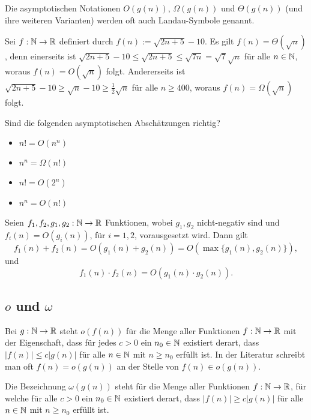 \begin{bem}
Die asymptotischen Notationen $O(g(n))$, $\Omega(g(n))$ und $\Theta(g(n))$ (und ihre weiteren Varianten) werden oft auch Landau-Symbole genannt.
\end{bem} 

\begin{bsp}
	Sei $f : \mathbb{N} \to \mathbb{R}$ definiert durch $f(n):=\sqrt{2 n + 5 } - 10$. Es gilt $f(n) = \Theta(\sqrt{n})$, denn einerseits ist $\sqrt{2n + 5} - 10 \le \sqrt{2n + 5} \le \sqrt{ 7n} = \sqrt{7} \sqrt{n}$ für alle $n \in \mathbb{N}$, woraus $f(n) = O(\sqrt{n})$ folgt. Andererseits ist $\sqrt{2n + 5} - 10 \ge \sqrt{n} - 10 \ge \frac{1}{2} \sqrt{n}$ für alle $n \ge 400$, woraus $f(n) = \Omega(\sqrt{n})$ folgt.  
\end{bsp}

\begin{aufg}
	Sind die folgenden asymptotischen Abschätzungen richtig?
	\begin{itemize}
		\item $n! = O(n^n)$
		\item $n^n = \Omega(n!)$
		\item $n! = O(2^n)$
		\item $n^n = O(n!)$
	\end{itemize}
\end{aufg}


\begin{bem}
	Seien $f_1,f_2,g_1,g_2 : \mathbb{N} \to \mathbb{R}$ Funktionen, wobei $g_1,g_2$ nicht-negativ sind und $f_i(n) = O(g_i(n))$, für $i=1,2$, vorausgesetzt wird. Dann gilt
	\[
	f_1(n) + f_2(n) = O(g_1(n)+g_2(n)) = O(\max\{g_1(n),g_2(n)\}),
	\]
	und
	\[
	f_1(n) \cdot f_2(n) = O(g_1(n)\cdot g_2(n)).
	\]
\end{bem}

\subsection{$o$ und $\omega$}

\begin{defn} 
Bei $g : \mathbb{N} \to \mathbb{R}$ steht $o(f(n))$ für die Menge aller Funktionen $f: \mathbb{N} \to \mathbb{R}$ mit der Eigenschaft, dass für jedes $c>0$ ein $n_0 \in \mathbb{N}$ existiert derart, dass $|f(n)| \le c |g(n)|$ für alle $n \in \mathbb{N}$ mit $n \ge n_0$ erfüllt ist. In der Literatur schreibt man oft $f(n) = o(g(n))$ an der Stelle von $f(n) \in o(g(n))$. 
\end{defn} 

\begin{defn}
Die Bezeichnung $\omega(g(n))$ steht für die Menge aller Funktionen $f : \mathbb{N} \to \mathbb{R}$, für welche für alle $c>0$ ein $n_0 \in \mathbb{N}$ existiert derart, dass $|f(n)| \ge c|g(n)|$ für alle $n \in \mathbb{N}$ mit $n \ge n_0$ erfüllt ist. 
\end{defn} 
